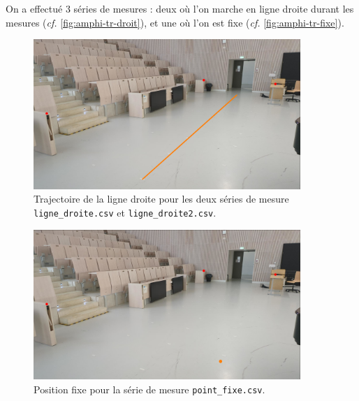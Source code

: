 \documentclass[french, a4paper, 12pt, parskip]{scrartcl}
\begin{document}
On a effectué 3 séries de mesures : deux où l'on marche en ligne droite durant
les mesures (\textit{cf.} \autoref{fig:amphi-tr-droit}), et une où l'on est fixe
(\textit{cf.} \autoref{fig:amphi-tr-fixe}).

\begin{figure}[p]
    \centering
    \includegraphics[width=0.9\textwidth]{amphi-orange.jpeg}
    \caption{Trajectoire de la ligne droite pour les deux séries de mesure
    \texttt{ligne\_droite.csv} et \texttt{ligne\_droite2.csv}.}
    \label{fig:amphi-tr-droit}
\end{figure}

\begin{figure}[p]
    \centering
    \includegraphics[width=0.9\textwidth]{amphi-orange2.jpeg}
    \caption{Position fixe pour la série de mesure \texttt{point\_fixe.csv}.}
    \label{fig:amphi-tr-fixe}
\end{figure}
\end{document}
